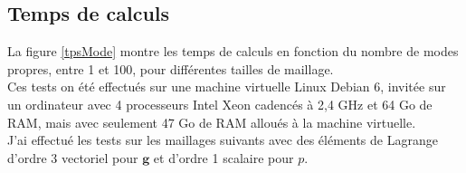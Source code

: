 


\subsection{Temps de calculs}
La figure \ref{tpsMode} montre les temps de calculs en fonction du nombre de modes propres, entre 1 et 100, pour différentes tailles de maillage.\\
Ces tests on été effectués sur une machine virtuelle Linux Debian 6, invitée sur un ordinateur avec 4 processeurs Intel Xeon cadencés à 2,4 GHz et 64 Go de RAM, mais avec seulement 47 Go de RAM alloués à la machine virtuelle.\\
J'ai effectué les tests sur les maillages suivants avec des éléments de Lagrange d'ordre 3 vectoriel pour $\mathbf{g}$ et d'ordre 1 scalaire pour $p$. \\

